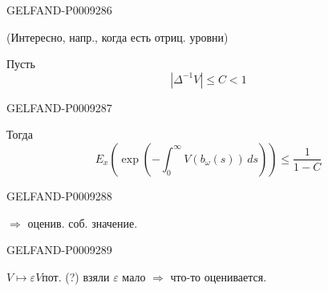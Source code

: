 \begin{GelfandAdjacentEvidence}{GELFAND-P000928}{6}


(Интересно, напр., когда есть отриц. уровни)

Пусть
\begin{equation*}
 \left|\Delta^{-1}V\right|\le C<1
 \tag{13}
\end{equation*}
\end{GelfandAdjacentEvidence}
\begin{GelfandAdjacentEvidence}{GELFAND-P000928}{7}


Тогда
\begin{equation*}
 E_x\left(\exp\left(-\int_0^\infty V(b_\omega(s))\,ds\right)\right)
 \le\frac{1}{1-C}
 \tag{14}
\end{equation*}
\end{GelfandAdjacentEvidence}
\begin{GelfandAdjacentEvidence}{GELFAND-P000928}{8}


$\Rightarrow$ оценив. соб. значение.
\end{GelfandAdjacentEvidence}
\begin{GelfandAdjacentEvidence}{GELFAND-P000928}{9}


$V\longmapsto\varepsilon V$\quad пот. (?) взяли $\varepsilon$ мало $\Rightarrow$ что-то оценивается.
\end{GelfandAdjacentEvidence}



